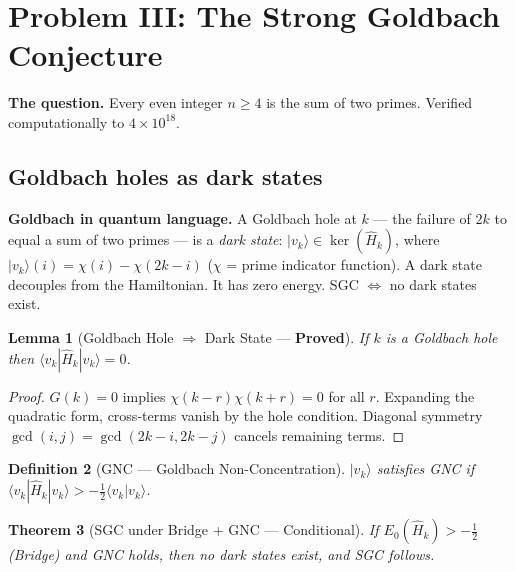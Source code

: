 \documentclass[12pt]{article}
\newtheorem{theorem}{Theorem}[section]
\newtheorem{lemma}[theorem]{Lemma}
\newtheorem{definition}[theorem]{Definition}
\newcommand{\ket}[1]{|{#1}\rangle}
\newcommand{\bra}[1]{\langle{#1}|}
\newcommand{\braket}[2]{\langle{#1}|{#2}\rangle}
\newcommand{\half}{\tfrac{1}{2}}
\begin{document}
\section{Problem III: The Strong Goldbach Conjecture}
\label{sec:goldbach}

\textbf{The question.}
Every even integer $n \ge 4$ is the sum of two primes.
Verified computationally to $4\times10^{18}$.

\subsection{Goldbach holes as dark states}

\begin{tcolorbox}[goldbox]
\textbf{Goldbach in quantum language.}
A Goldbach hole at $k$ --- the failure of $2k$ to equal a sum of
two primes --- is a \emph{dark state}:
$\ket{v_k} \in \ker(\hat{H}_k)$,
where $\ket{v_k}(i) = \chi(i) - \chi(2k-i)$
($\chi$ = prime indicator function).
A dark state decouples from the Hamiltonian.
It has zero energy.
SGC $\Longleftrightarrow$ no dark states exist.
\end{tcolorbox}

\begin{tcolorbox}[provedbox]
\begin{lemma}[Goldbach Hole $\Rightarrow$ Dark State --- \textbf{Proved}]
If $k$ is a Goldbach hole then $\bra{v_k}\hat{H}_k\ket{v_k} = 0$.
\end{lemma}
\end{tcolorbox}

\begin{proof}
$G(k)=0$ implies $\chi(k-r)\chi(k+r)=0$ for all $r$.
Expanding the quadratic form, cross-terms vanish by the hole condition.
Diagonal symmetry $\gcd(i,j)=\gcd(2k-i,2k-j)$ cancels remaining terms.
\end{proof}

\begin{definition}[GNC --- Goldbach Non-Concentration]
$\ket{v_k}$ satisfies GNC if
$\bra{v_k}\hat{H}_k\ket{v_k} > -\half\braket{v_k}{v_k}$.
\end{definition}

\begin{tcolorbox}[keybox]
\begin{theorem}[SGC under Bridge + GNC --- Conditional]
If $E_0(\hat{H}_k) > -\half$ (Bridge) and GNC holds,
then no dark states exist, and SGC follows.
\end{theorem}
\end{tcolorbox}
\end{document}
